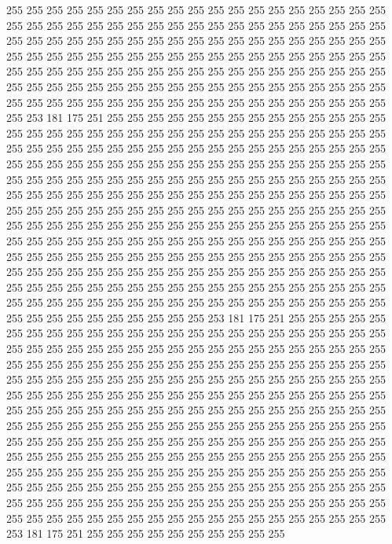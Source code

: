 255 255 255 255 255 255 255 255 255 255 255 255 255 255 255 255 255 255 255 255
255 255 255 255 255 255 255 255 255 255 255 255 255 255 255 255 255 255 255 255
255 255 255 255 255 255 255 255 255 255 255 255 255 255 255 255 255 255 255 255
255 255 255 255 255 255 255 255 255 255 255 255 255 255 255 255 255 255 255 255
255 255 255 255 255 255 255 255 255 255 255 255 255 255 255 255 255 255 255 255
255 255 255 255 255 255 255 255 255 255 255 255 255 255 255 255 255 255 255 255
255 255 255 255 255 255 255 255 255 255 255 255 255 255 253 181 175 251 255 255
255 255 255 255 255 255 255 255 255 255 255 255 255 255 255 255 255 255 255 255
255 255 255 255 255 255 255 255 255 255 255 255 255 255 255 255 255 255 255 255
255 255 255 255 255 255 255 255 255 255 255 255 255 255 255 255 255 255 255 255
255 255 255 255 255 255 255 255 255 255 255 255 255 255 255 255 255 255 255 255
255 255 255 255 255 255 255 255 255 255 255 255 255 255 255 255 255 255 255 255
255 255 255 255 255 255 255 255 255 255 255 255 255 255 255 255 255 255 255 255
255 255 255 255 255 255 255 255 255 255 255 255 255 255 255 255 255 255 255 255
255 255 255 255 255 255 255 255 255 255 255 255 255 255 255 255 255 255 255 255
255 255 255 255 255 255 255 255 255 255 255 255 255 255 255 255 255 255 255 255
255 255 255 255 255 255 255 255 255 255 255 255 255 255 255 255 255 255 255 255
255 255 255 255 255 255 255 255 255 255 255 255 255 255 255 255 255 255 255 255
255 255 255 255 255 255 255 255 255 255 255 255 255 255 255 255 255 255 255 255
255 255 255 255 255 255 255 255 255 255 253 181 175 251 255 255 255 255 255 255
255 255 255 255 255 255 255 255 255 255 255 255 255 255 255 255 255 255 255 255
255 255 255 255 255 255 255 255 255 255 255 255 255 255 255 255 255 255 255 255
255 255 255 255 255 255 255 255 255 255 255 255 255 255 255 255 255 255 255 255
255 255 255 255 255 255 255 255 255 255 255 255 255 255 255 255 255 255 255 255
255 255 255 255 255 255 255 255 255 255 255 255 255 255 255 255 255 255 255 255
255 255 255 255 255 255 255 255 255 255 255 255 255 255 255 255 255 255 255 255
255 255 255 255 255 255 255 255 255 255 255 255 255 255 255 255 255 255 255 255
255 255 255 255 255 255 255 255 255 255 255 255 255 255 255 255 255 255 255 255
255 255 255 255 255 255 255 255 255 255 255 255 255 255 255 255 255 255 255 255
255 255 255 255 255 255 255 255 255 255 255 255 255 255 255 255 255 255 255 255
255 255 255 255 255 255 255 255 255 255 255 255 255 255 255 255 255 255 255 255
255 255 255 255 255 255 255 255 255 255 255 255 255 255 255 255 255 255 255 255
255 255 255 255 255 255 253 181 175 251 255 255 255 255 255 255 255 255 255 255
